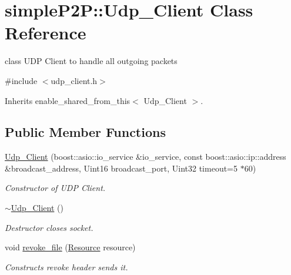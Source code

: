 \hypertarget{classsimpleP2P_1_1Udp__Client}{}\section{simple\+P2P\+:\+:Udp\+\_\+\+Client Class Reference}
\label{classsimpleP2P_1_1Udp__Client}


class U\+DP Client to handle all outgoing packets  




{\ttfamily \#include $<$udp\+\_\+client.\+h$>$}



Inherits enable\+\_\+shared\+\_\+from\+\_\+this$<$ Udp\+\_\+\+Client $>$.

\subsection*{Public Member Functions}
\begin{DoxyCompactItemize}
\item 
\hyperlink{classsimpleP2P_1_1Udp__Client_acb5ed96ec556665f56510c27f234bb5a}{Udp\+\_\+\+Client} (boost\+::asio\+::io\+\_\+service \&io\+\_\+service, const boost\+::asio\+::ip\+::address \&broadcast\+\_\+address, Uint16 broadcast\+\_\+port, Uint32 timeout=5 $\ast$60)
\begin{DoxyCompactList}\small\item\em Constructor of U\+DP Client. \end{DoxyCompactList}\item 
\mbox{\label{classsimpleP2P_1_1Udp__Client_a710c95899ddcfba71004d780ab4c1e4d}} 
\hyperlink{classsimpleP2P_1_1Udp__Client_a710c95899ddcfba71004d780ab4c1e4d}{$\sim$\+Udp\+\_\+\+Client} ()
\begin{DoxyCompactList}\small\item\em Destructor closes socket. \end{DoxyCompactList}\item 
void \hyperlink{classsimpleP2P_1_1Udp__Client_a459f622d0f3671d48d33bce035f5de90}{revoke\+\_\+file} (\hyperlink{classsimpleP2P_1_1Resource}{Resource} resource)
\begin{DoxyCompactList}\small\item\em Constructs revoke header sends it. \end{DoxyCompactList}\end{DoxyCompactItemize}


